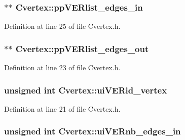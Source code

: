 \subsubsection[{pp\+V\+E\+Rlist\+\_\+edges\+\_\+in}]{$\ast$$\ast$ Cvertex\+::pp\+V\+E\+Rlist\+\_\+edges\+\_\+in\hspace{0.3cm}{\ttfamily [private]}}\label{class_cvertex_a3a98de13fcfd72d549b013a4697b795e}


Definition at line 25 of file Cvertex.\+h.

\hypertarget{class_cvertex_a4ab1d9ae28e17af0c8c3bc9da55d6e0a}{}
\subsubsection[{pp\+V\+E\+Rlist\+\_\+edges\+\_\+out}]{$\ast$$\ast$ Cvertex\+::pp\+V\+E\+Rlist\+\_\+edges\+\_\+out\hspace{0.3cm}{\ttfamily [private]}}\label{class_cvertex_a4ab1d9ae28e17af0c8c3bc9da55d6e0a}


Definition at line 23 of file Cvertex.\+h.

\hypertarget{class_cvertex_ad10db8510c415314374789472f1436fc}{}
\subsubsection[{ui\+V\+E\+Rid\+\_\+vertex}]{\setlength{\rightskip}{0pt plus 5cm}unsigned int Cvertex\+::ui\+V\+E\+Rid\+\_\+vertex\hspace{0.3cm}{\ttfamily [private]}}\label{class_cvertex_ad10db8510c415314374789472f1436fc}


Definition at line 21 of file Cvertex.\+h.

\hypertarget{class_cvertex_aefb09bb4a45f00a7de925bb63d2291a7}{}
\subsubsection[{ui\+V\+E\+Rnb\+\_\+edges\+\_\+in}]{\setlength{\rightskip}{0pt plus 5cm}unsigned int Cvertex\+::ui\+V\+E\+Rnb\+\_\+edges\+\_\+in\hspace{0.3cm}{\ttfamily [private]}}\label{class_cvertex_aefb09bb4a45f00a7de925bb63d2291a7}


